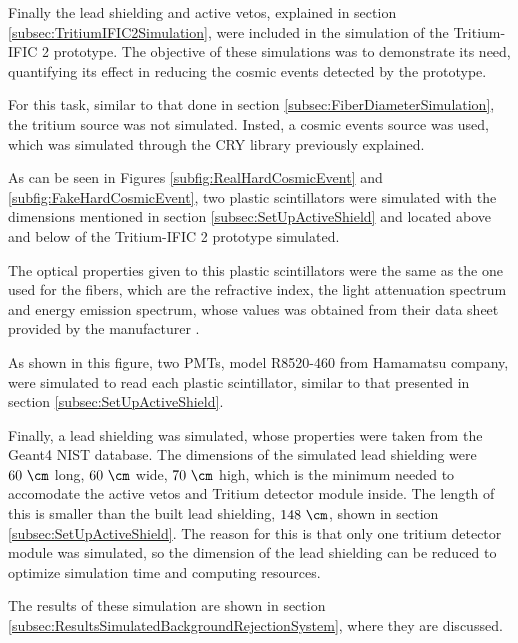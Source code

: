 Finally the lead shielding and active vetos, explained in section \ref{subsec:TritiumIFIC2Simulation}, were included in the simulation of the Tritium-IFIC 2 prototype. The objective of these simulations was to demonstrate its need, quantifying its effect in reducing the cosmic events detected by the prototype.

For this task, similar to that done in section \ref{subsec:FiberDiameterSimulation}, the tritium source was not simulated. Insted, a cosmic events source was used, which was simulated through the CRY library previously explained.

As can be seen in Figures \ref{subfig:RealHardCosmicEvent} and \ref{subfig:FakeHardCosmicEvent}, two plastic scintillators were simulated with the dimensions mentioned in section \ref{subsec:SetUpActiveShield} and located above and below of the Tritium-IFIC 2 prototype simulated. 

The optical properties given to this plastic scintillators were the same as the one used for the fibers, which are the refractive index, the light attenuation spectrum and energy emission spectrum, whose values was obtained from their data sheet provided by the manufacturer \cite{ScintillatorVeto}.

As shown in this figure, two PMTs, model R8520-460 from Hamamatsu company, were simulated to read each plastic scintillator, similar to that presented in section \ref{subsec:SetUpActiveShield}.

Finally, a lead shielding was simulated, whose properties were taken from the Geant4 NIST database. The dimensions of the simulated lead shielding were $60~\cm$ long, $60~\cm$ wide, $70~\cm$ high, which is the minimum needed to accomodate the active vetos and Tritium detector module inside.  The length of this is smaller than the built lead shielding, $148~\cm$, shown in section \ref{subsec:SetUpActiveShield}. The reason for this is that only one tritium detector module was simulated, so the dimension of the lead shielding can be reduced to optimize simulation time and computing resources.

The results of these simulation are shown in section \ref{subsec:ResultsSimulatedBackgroundRejectionSystem}, where they are discussed.